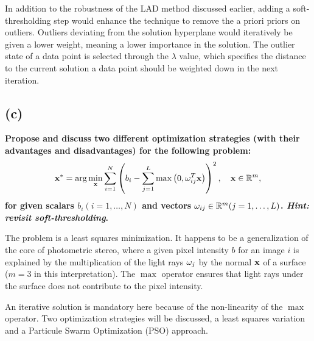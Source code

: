 \documentclass{report}
\begin{document}
In addition to the robustness of the LAD method discussed earlier, adding a soft-thresholding step would enhance the technique to remove the a priori priors on outliers. Outliers deviating from the solution hyperplane would iteratively be given a lower weight, meaning a lower importance in the solution. The outlier state of a data point is selected through the $\lambda$ value, which specifies the distance to the current solution a data point should be weighted down in the next iteration.

\subsection{(c)}
\textbf{ Propose and discuss two different optimization strategies (with their advantages and disadvantages) for the following problem:
\begin{equation}
\mathbf{x^*} = \arg \min_{\mathbf{x}} \sum_{i=1}^N \left( b_i - \sum_{j=1}^L \max\left( 0, \omega_{ij}^T\mathbf{x}\right) \right)^2, \quad \mathbf{x} \in \mathbb{R}^m,
\end{equation}
for given scalars $b_i (i = 1, \dots, N)$ and vectors $\mathbf{\omega}_{ij} \in \mathbb{R}^m (j = 1, \dots, L)$. \emph{Hint: revisit soft-thresholding}.}

The problem is a least squares minimization. It happens to be a generalization of the core of photometric stereo, where a given pixel intensity $b$ for an image $i$ is explained by the multiplication of the light rays $\mathbf{\omega}_j$ by the normal $\mathbf{x}$ of a surface ($m = 3$ in this interpretation). The $\max$ operator ensures that light rays under the surface does not contribute to the pixel intensity.

An iterative solution is mandatory here because of the non-linearity of the $\max$ operator. Two optimization strategies will be discussed, a least squares variation and a Particule Swarm Optimization (PSO) approach.
\end{document}
